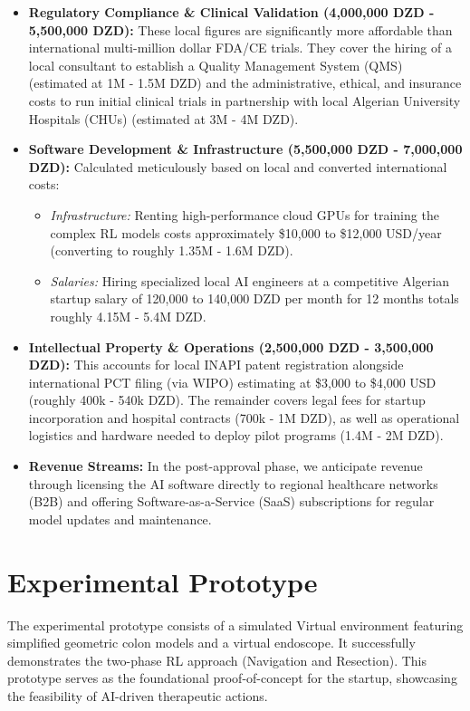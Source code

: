 \begin{itemize}
    \item \textbf{Regulatory Compliance \& Clinical Validation (4,000,000 DZD - 5,500,000 DZD):} These local figures are significantly more affordable than international multi-million dollar FDA/CE trials. They cover the hiring of a local consultant to establish a Quality Management System (QMS) (estimated at 1M - 1.5M DZD) and the administrative, ethical, and insurance costs to run initial clinical trials in partnership with local Algerian University Hospitals (CHUs) (estimated at 3M - 4M DZD).
    \item \textbf{Software Development \& Infrastructure (5,500,000 DZD - 7,000,000 DZD):} Calculated meticulously based on local and converted international costs:
    \begin{itemize}
        \item \textit{Infrastructure:} Renting high-performance cloud GPUs for training the complex RL models costs approximately \$10,000 to \$12,000 USD/year (converting to roughly 1.35M - 1.6M DZD).
        \item \textit{Salaries:} Hiring specialized local AI engineers at a competitive Algerian startup salary of 120,000 to 140,000 DZD per month for 12 months totals roughly 4.15M - 5.4M DZD.
    \end{itemize}
    \item \textbf{Intellectual Property \& Operations (2,500,000 DZD - 3,500,000 DZD):} This accounts for local INAPI patent registration alongside international PCT filing (via WIPO) estimating at \$3,000 to \$4,000 USD (roughly 400k - 540k DZD). The remainder covers legal fees for startup incorporation and hospital contracts (700k - 1M DZD), as well as operational logistics and hardware needed to deploy pilot programs (1.4M - 2M DZD).
    \item \textbf{Revenue Streams:} In the post-approval phase, we anticipate revenue through licensing the AI software directly to regional healthcare networks (B2B) and offering Software-as-a-Service (SaaS) subscriptions for regular model updates and maintenance.
\end{itemize}

\section{Experimental Prototype}
The experimental prototype consists of a simulated Virtual environment featuring simplified geometric colon models and a virtual endoscope. It successfully demonstrates the two-phase RL approach (Navigation and Resection). This prototype serves as the foundational proof-of-concept for the startup, showcasing the feasibility of AI-driven therapeutic actions.

